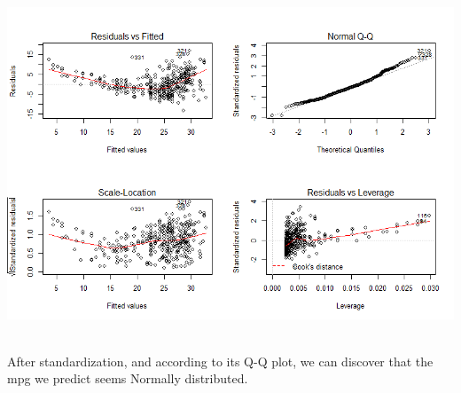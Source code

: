 \documentclass[12pt]{article}
\begin{document}
\begin{itemize}
\centerline{\includegraphics[width=0.8\linewidth]{many}}
\ \\
After standardization, and according to its Q-Q plot, we can discover that the mpg we predict seems Normally distributed. 
\end{itemize}
\end{document}
